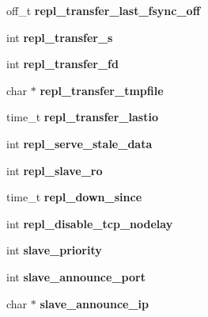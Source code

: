 \begin{DoxyCompactItemize}
off\+\_\+t {\bfseries repl\+\_\+transfer\+\_\+last\+\_\+fsync\+\_\+off}
\item 
\mbox{\label{structredisServer_a79362be891e54be9e5cc0ea70403ebe9}} 
int {\bfseries repl\+\_\+transfer\+\_\+s}
\item 
\mbox{\label{structredisServer_aa6b00f4f1784e187fad97dad3a173c43}} 
int {\bfseries repl\+\_\+transfer\+\_\+fd}
\item 
\mbox{\label{structredisServer_afafdd87eab1e9531eb8b52a26b130a4f}} 
char $\ast$ {\bfseries repl\+\_\+transfer\+\_\+tmpfile}
\item 
\mbox{\label{structredisServer_aef8f47c1883b1ab1ba15bdc409d95af7}} 
time\+\_\+t {\bfseries repl\+\_\+transfer\+\_\+lastio}
\item 
\mbox{\label{structredisServer_a7e0d0f265c5394e6f19be48bb538ebcc}} 
int {\bfseries repl\+\_\+serve\+\_\+stale\+\_\+data}
\item 
\mbox{\label{structredisServer_a51f27a1123c714263fb3457ca7c61c1b}} 
int {\bfseries repl\+\_\+slave\+\_\+ro}
\item 
\mbox{\label{structredisServer_a8cb8f296b822a35d6caad982205604ec}} 
time\+\_\+t {\bfseries repl\+\_\+down\+\_\+since}
\item 
\mbox{\label{structredisServer_a6b3b349f90330da0cfba8f89a92bf668}} 
int {\bfseries repl\+\_\+disable\+\_\+tcp\+\_\+nodelay}
\item 
\mbox{\label{structredisServer_a30332ecb91ab2b62bec5b08a9495c196}} 
int {\bfseries slave\+\_\+priority}
\item 
\mbox{\label{structredisServer_ad513b148aed3e0182fe8de85143ebf69}} 
int {\bfseries slave\+\_\+announce\+\_\+port}
\item 
\mbox{\label{structredisServer_a0eba76eeb70d2d95ce3fa0f2be662b3b}} 
char $\ast$ {\bfseries slave\+\_\+announce\+\_\+ip}
\item 

\end{DoxyCompactItemize}
